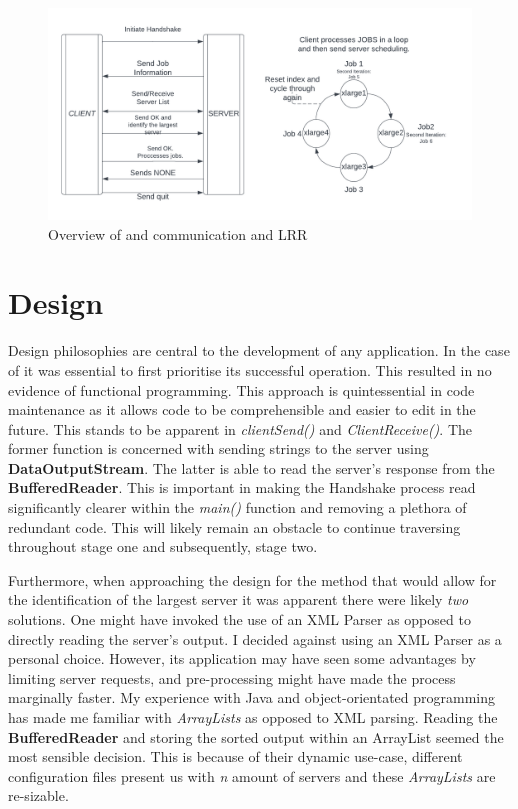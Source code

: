 \documentclass{article}
\begin{document}
\begin{figure}[htbp]
  \begin{minipage}{1\textwidth}
    \includegraphics[width=\textwidth]{images/short3.png}
  \end{minipage}
  \hfill
  \begin{minipage}{1\textwidth}\raggedright
    \caption{Overview of \textbf{} and \textbf{} communication and LRR}
    \label{fig:image_label}
  \end{minipage}
\end{figure}

\section{Design }
Design philosophies are central to the development of any application. In the case of \textbf{} it was essential to first prioritise its successful operation. This resulted in no evidence of functional programming. This approach is quintessential in code maintenance as it allows code to be comprehensible and easier to edit in the future. This stands to be apparent in \emph{clientSend()} and \emph{ClientReceive()}. The former function is concerned with sending strings to the server using \textbf{DataOutputStream}. The latter is able to read the server's response from the \textbf{BufferedReader}. This is important in making the Handshake process read significantly clearer within the \emph{main()} function and removing a plethora of redundant code. This will likely remain an obstacle to continue traversing throughout stage one and subsequently, stage two.

Furthermore, when approaching the design for the method that would allow for the identification of the largest server it was apparent there were likely \emph{two} solutions. One might have invoked the use of an XML Parser as opposed to directly reading the server's output. I decided against using an XML Parser as a personal choice. However, its application may have seen some advantages by limiting server requests, and pre-processing might have made the process marginally faster. My experience with Java and object-orientated programming has made me familiar with \emph{ArrayLists} as opposed to XML parsing. Reading the \textbf{BufferedReader} and storing the sorted output within an ArrayList seemed the most sensible decision. This is because of their dynamic use-case, different configuration files present us with \emph{n} amount of servers and these \emph{ArrayLists} are re-sizable.
\end{document}
